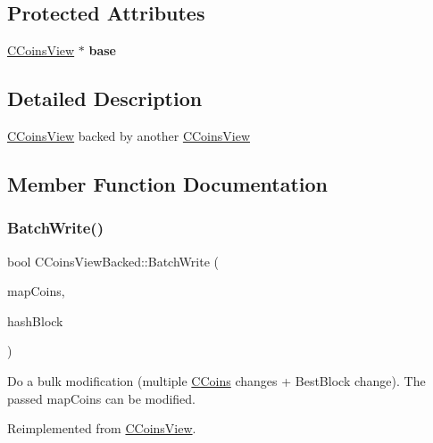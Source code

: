 \subsection*{Protected Attributes}
\begin{DoxyCompactItemize}
\item 
\mbox{\label{class_c_coins_view_backed_a901472317114adc4c104efd61dcf6203}} 
\mbox{\hyperlink{class_c_coins_view}{C\+Coins\+View}} $\ast$ {\bfseries base}
\end{DoxyCompactItemize}


\subsection{Detailed Description}
\mbox{\hyperlink{class_c_coins_view}{C\+Coins\+View}} backed by another \mbox{\hyperlink{class_c_coins_view}{C\+Coins\+View}} 

\subsection{Member Function Documentation}
\mbox{\label{class_c_coins_view_backed_ace15da3934c9d7a9cb9c7a787f92f764}} 
\subsubsection{\texorpdfstring{Batch\+Write()}{BatchWrite()}}
{\footnotesize\ttfamily bool C\+Coins\+View\+Backed\+::\+Batch\+Write (\begin{DoxyParamCaption}\item[{C\+Coins\+Map \&}]{map\+Coins,  }\item[{const \mbox{\hyperlink{classuint256}{uint256}} \&}]{hash\+Block }\end{DoxyParamCaption})\hspace{0.3cm}{\ttfamily [virtual]}}

Do a bulk modification (multiple \mbox{\hyperlink{class_c_coins}{C\+Coins}} changes + Best\+Block change). The passed map\+Coins can be modified. 

Reimplemented from \mbox{\hyperlink{class_c_coins_view_ad7dc37396ca4fac7014cea06fec7178e}{C\+Coins\+View}}.



